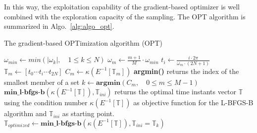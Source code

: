 In this way, the exploitation capability of the gradient-based
optimizer is well combined with the exploration capacity of the
sampling. The OPT algorithm is summarized in Algo.~\ref{alg:algo_opt}.
\begin{algorithm}
\caption{The gradient-based OPTimization algorithm (OPT)}
\label{alg:algo_opt}
\begin{algorithmic}
\STATE $\omega_{min} \leftarrow min \left( |\omega_k |,\quad 1 \leqslant k \leqslant N \right)$
    \STATE $\omega_m \leftarrow \frac{m + 1}{M} \cdot \omega_{min}$
        \STATE $t_i \leftarrow \displaystyle\frac{i \cdot 2 \pi}{\omega_m \cdot (2N + 1)}$
    \ENDFOR
    \STATE $\mathbb{T}_m \leftarrow [t_0 \cdots  t_i \cdots t_{2N}]$
    \STATE $C_m \leftarrow \kappa \left(E^{-1} \left[\mathbb{T}_m \right] \right)$
\ENDFOR
\STATE \textbf{argmin()} returns the index of the smallest member of a set
\STATE $k \leftarrow \textbf{argmin}\left(C_m,\quad 0\leqslant m \leqslant M-1\right)$
\STATE $\textbf{min\_l-bfgs-b}\left(\kappa \left(E^{-1} \left[\mathbb{T}\right]\right), \mathbb{T}_{ini}\right)$ returns the optimal 
time instants vector $\mathbb{T}$ using the condition number $\kappa\left(E^{-1} \left[\mathbb{T}\right]\right)$ as objective function 
for the L-BFGS-B algorithm and  $\mathbb{T}_{ini}$ as starting point.
\STATE $\mathbb{T}_{optimized} \leftarrow 
  \textbf{min\_l-bfgs-b}\left(\kappa\left(E^{-1} \left[\mathbb{T}\right]\right), \mathbb{T}_{ini}=\mathbb{T}_k\right)$
\end{algorithmic}
\end{algorithm}

